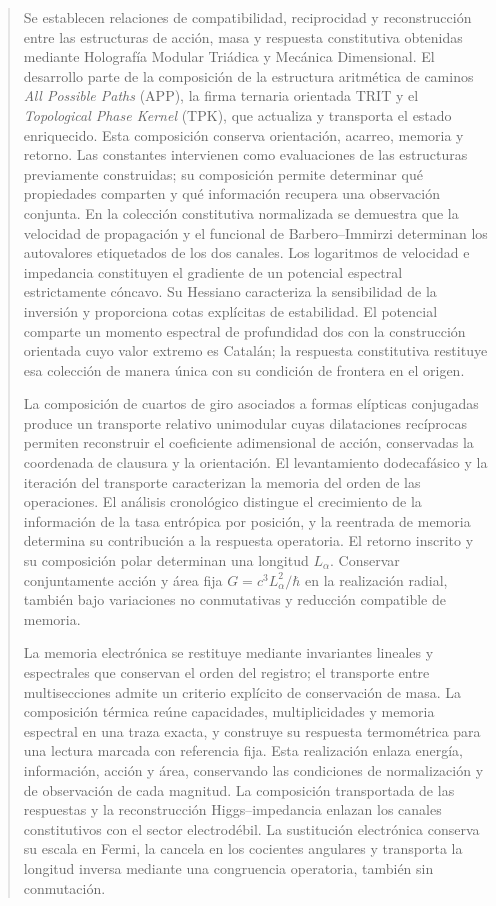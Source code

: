 \begingroup\fontsize{9.5}{10.7}\selectfont\begin{abstract}
Se establecen relaciones de compatibilidad, reciprocidad y reconstrucción
entre las estructuras de acción, masa y respuesta constitutiva obtenidas
mediante Holografía Modular Triádica y Mecánica Dimensional. El desarrollo
parte de la composición de la estructura aritmética de caminos
\emph{All Possible Paths} (APP), la firma ternaria orientada TRIT y el
\emph{Topological Phase Kernel} (TPK), que actualiza y transporta el estado
enriquecido. Esta composición conserva orientación, acarreo, memoria y
retorno. Las constantes intervienen como evaluaciones de las
estructuras previamente construidas; su composición permite determinar qué
propiedades comparten y qué información recupera una observación conjunta.
En la colección constitutiva normalizada se demuestra que la velocidad de
propagación y el funcional de Barbero--Immirzi determinan los autovalores
etiquetados de los dos canales. Los logaritmos de velocidad e impedancia
constituyen el gradiente de un potencial espectral estrictamente cóncavo.
Su Hessiano caracteriza la sensibilidad de la inversión y proporciona cotas
explícitas de estabilidad. El potencial comparte un momento espectral de
profundidad dos con la construcción orientada cuyo valor extremo es Catalán;
la respuesta constitutiva restituye esa colección de manera única con su
condición de frontera en el origen.

La composición de cuartos de giro asociados a formas elípticas conjugadas
produce un transporte relativo unimodular cuyas dilataciones recíprocas
permiten reconstruir el coeficiente adimensional de acción, conservadas la
coordenada de clausura y la orientación. El levantamiento dodecafásico y la
iteración del transporte caracterizan la memoria del orden de las
operaciones. El análisis cronológico distingue el crecimiento de la
información de la tasa entrópica por posición, y la reentrada de memoria
determina su contribución a la respuesta operatoria. El retorno inscrito y
su composición polar determinan una longitud $L_\alpha$. Conservar
conjuntamente acción y área fija $G=c^3L_\alpha^2/\hbar$ en la realización
radial, también bajo variaciones no conmutativas y reducción compatible
de memoria.

La memoria electrónica se restituye mediante invariantes lineales y
espectrales que conservan el orden del registro; el transporte entre
multisecciones admite un criterio explícito de conservación de masa.
La composición térmica reúne capacidades, multiplicidades y memoria
espectral en una traza exacta, y construye su respuesta termométrica
para una lectura marcada con referencia fija. Esta realización enlaza
energía, información, acción y área, conservando las condiciones de
normalización y de observación de cada magnitud.
La composición transportada de las respuestas y la reconstrucción
Higgs--impedancia enlazan los canales constitutivos con el sector
electrodébil. La sustitución electrónica conserva su escala en Fermi,
la cancela en los cocientes angulares y transporta la longitud inversa
mediante una congruencia operatoria, también sin conmutación.


\end{abstract}
